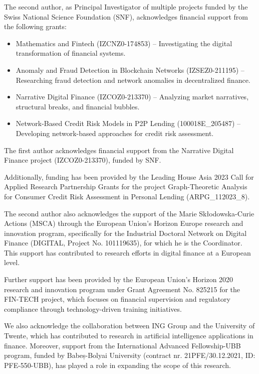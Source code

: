 \documentclass{article}[a4paper]
\begin{document}
The second author, as Principal Investigator of multiple projects funded by the Swiss National Science Foundation (SNF), acknowledges financial support from the following grants:
\begin{itemize}
    \item Mathematics and Fintech (IZCNZ0-174853) – Investigating the digital transformation of financial systems.
    \item Anomaly and Fraud Detection in Blockchain Networks (IZSEZ0-211195) – Researching fraud detection and network anomalies in decentralized finance.
    \item Narrative Digital Finance (IZCOZ0-213370) – Analyzing market narratives, structural breaks, and financial bubbles.
    \item Network-Based Credit Risk Models in P2P Lending (100018E\_205487) – Developing network-based approaches for credit risk assessment.
\end{itemize}

The first author acknowledges financial support from the Narrative Digital Finance project (IZCOZ0-213370), funded by SNF.

Additionally, funding has been provided by the Leading House Asia 2023 Call for Applied Research Partnership Grants for the project Graph-Theoretic Analysis for Consumer Credit Risk Assessment in Personal Lending (ARPG\_112023\_8).

The second author also acknowledges the support of the Marie Skłodowska-Curie Actions (MSCA) through the European Union’s Horizon Europe research and innovation program, specifically for the Industrial Doctoral Network on Digital Finance (DIGITAL, Project No. 101119635), for which he is the Coordinator. This support has contributed to research efforts in digital finance at a European level.

Further support has been provided by the European Union’s Horizon 2020 research and innovation program under Grant Agreement No. 825215 for the FIN-TECH project, which focuses on financial supervision and regulatory compliance through technology-driven training initiatives.

We also acknowledge the collaboration between ING Group and the University of Twente, which has contributed to research in artificial intelligence applications in finance. Moreover, support from the International Advanced Fellowship-UBB program, funded by Babeș-Bolyai University (contract nr. 21PFE/30.12.2021, ID: PFE-550-UBB), has played a role in expanding the scope of this research.
\end{document}
